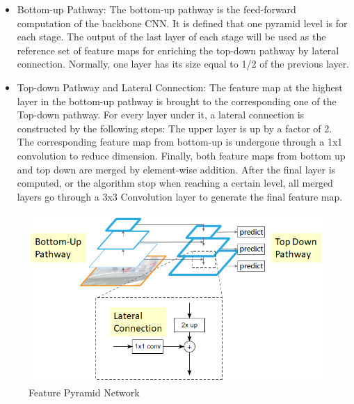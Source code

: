 \begin{itemize}
    \item Bottom-up Pathway: The bottom-up pathway is the feed-forward computation of the backbone CNN. It is defined that one pyramid level is for each stage. The output of the last layer of each stage will be used as the reference set of feature maps for enriching the top-down pathway by lateral connection. Normally, one layer has its size equal to 1/2 of the previous layer.
    \item Top-down Pathway and Lateral Connection: The feature map at the highest layer in the bottom-up pathway is brought to the corresponding one of the Top-down pathway. For every layer under it, a lateral connection is constructed by the following steps: The upper layer is up by a factor of 2. The corresponding feature map from bottom-up is undergone through a 1x1 convolution to reduce dimension. Finally, both feature maps from bottom up and top down are merged by element-wise addition.
    After the final layer is computed, or the algorithm stop when reaching a certain level, all merged layers go through a 3x3 Convolution layer to generate the final feature map.
\end{itemize}
\begin{figure}[!t]
    \includegraphics[width=14cm]{Images/recognition/FPN.png}
    \caption{Feature Pyramid Network}
    \label{fig: FPN}
\end{figure}


